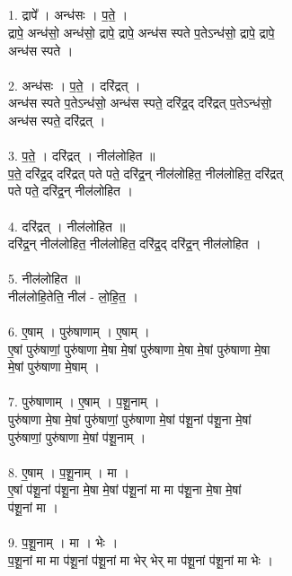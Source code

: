 \subsection{}
1. द्रापे᳚ । अन्ध॑सः । प॒ते॒ ।\\
द्रापे॒ अन्ध॑सो॒ अन्ध॑सो॒ द्रापे॒ द्रापे॒ अन्ध॑स स्पते प॒तेऽन्ध॑सो॒ द्रापे॒ द्रापे॒\\
अन्ध॑स स्पते ।\\
\\
2. अन्ध॑सः । प॒ते॒ । दरि॑द्रत् ।\\
अन्ध॑स स्पते प॒तेऽन्ध॑सो॒ अन्ध॑स स्पते॒ दरि॑द्र॒द् दरि॑द्रत् प॒तेऽन्ध॑सो॒\\
अन्ध॑स स्पते॒ दरि॑द्रत् ।\\
\\
3. प॒ते॒ । दरि॑द्रत् । नील॑लोहित ॥\\
प॒ते॒ दरि॑द्र॒द् दरि॑द्रत् पते पते॒ दरि॑द्र॒न् नील॑लोहित॒ नील॑लोहित॒ दरि॑द्रत्\\
पते पते॒ दरि॑द्र॒न् नील॑लोहित ।\\
\\
4. दरि॑द्रत् । नील॑लोहित ॥\\
दरि॑द्र॒न् नील॑लोहित॒ नील॑लोहित॒ दरि॑द्र॒द् दरि॑द्र॒न् नील॑लोहित ।\\
\\
5. नील॑लोहित ॥\\
नील॑लोहि॒तेति॒ नील॑ - लो॒हि॒त॒ ।\\
\\
6. ए॒षाम् । पुरु॑षाणाम् । ए॒षाम् ।\\
ए॒षां पुरु॑षाणां॒ पुरु॑षाणा मे॒षा मे॒षां पुरु॑षाणा मे॒षा मे॒षां पुरु॑षाणा मे॒षा\\
मे॒षां पुरु॑षाणा मे॒षाम् ।\\
\\
7. पुरु॑षाणाम् । ए॒षाम् । प॒शू॒नाम् ।\\
पुरु॑षाणा मे॒षा मे॒षां पुरु॑षाणां॒ पुरु॑षाणा मे॒षां प॑शू॒नां प॑शू॒ना मे॒षां\\
पुरु॑षाणां॒ पुरु॑षाणा मे॒षां प॑शू॒नाम् ।\\
\\
8. ए॒षाम् । प॒शू॒नाम् । मा ।\\
ए॒षां प॑शू॒नां प॑शू॒ना मे॒षा मे॒षां प॑शू॒नां मा मा प॑शू॒ना मे॒षा मे॒षां\\
प॑शू॒नां मा ।\\
\\
9. प॒शू॒नाम् । मा । भेः ।\\
प॒शू॒नां मा मा प॑शू॒नां प॑शू॒नां मा भेर् भेर् मा प॑शू॒नां प॑शू॒नां मा भेः ।\\
